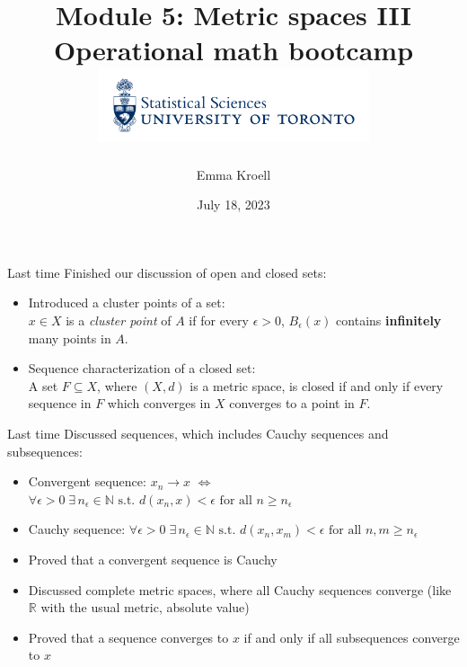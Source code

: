 \documentclass [aspectratio=169]{beamer}
\title[]{Module 5: Metric spaces III \\ {\large Operational math bootcamp}\\ \includegraphics[width=8cm]{dept_logo.png}\vspace{-1em}}
\author[]{Emma Kroell}
\institute[]{University of Toronto}
\date{July 18, 2023}
\newcommand{\R}{{\mathbb{R}}}
\newcommand{\N}{{\mathbb{N}}}
\begin{document}
{
\begin{frame}
    \titlepage
\end{frame}
}

\begin{frame}{Last time}
Finished our discussion of open and closed sets:
\vspace{0.5em}
	\begin{itemize}
	\setlength\itemsep{0.7em}
	\item Introduced a cluster points of a set: \\
	$x \in X$ is a \emph{cluster point} of $A$ if for every $\epsilon >0$, $B_\epsilon(x)$ contains \textbf{infinitely} many points in $A$.
	\item Sequence characterization of a closed set: \\
	A set $F \subseteq X$, where $(X, d)$ is a metric space, is closed if and only if every sequence in $F$ which converges in $X$ converges to a point in $F$.
	\end{itemize}
\end{frame}

\begin{frame}{Last time}
Discussed sequences, which includes Cauchy sequences and subsequences:
\vspace{0.5em}
	\begin{itemize}
	   \setlength\itemsep{0.6em}
	\item Convergent sequence: $x_n \to x$ $\Leftrightarrow$ $\forall \epsilon > 0 \; \exists \, n_\epsilon \in \N \text{ s.t. } d(x_n,x) < \epsilon \text{ for all } n \geq n_\epsilon$
	\item Cauchy sequence:  $ \forall \epsilon>0 \; \exists \, n_\epsilon \in \N \text{ s.t. } d(x_n,x_m) < \epsilon \text{ for all } n,m \geq n_\epsilon$
	\item Proved that a convergent sequence is Cauchy
	\item Discussed complete metric spaces, where all Cauchy sequences converge (like $\R$ with the usual metric, absolute value)
	\item Proved that a sequence converges to $x$ if and only if all subsequences converge to $x$
    \end{itemize}
\end{frame}
\end{document}
